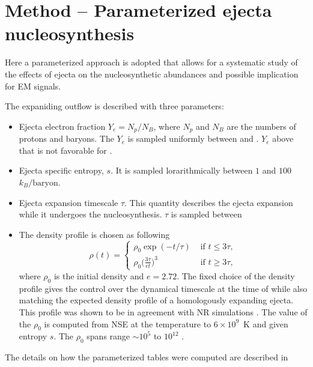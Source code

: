 \section{Method -- Parameterized ejecta nucleosynthesis}


Here a parameterized approach is adopted that allows for a systematic study of the effects of ejecta on the nucleosynthetic abundances and possible implication for \ac{EM} signals. 

The expaniding outflow is described with three parameters:

\begin{itemize}
    \item Ejecta electron fraction $Y_e=N_p/N_B$, where $N_p$ and $N_B$ are the numbers of protons and baryons. The $Y_e$ is sampled uniformly between  and . $Y_e$ above that is not favorable for \rproc{}.
    \item Ejecta specific entropy, $s$. It is sampled lorarithmically between $1$ and $100$ $k_B/\text{baryon}$.
    \item Ejecta expansion timescale $\tau$. This quantity describes the ejecta expansion while it undergoes the nucleosynthesis. $\tau$ is sampled between  
    \item The density profile is chosen as following 
    \begin{equation}
        \rho(t) = 
        \begin{cases}
            \rho_0 \exp(-t / \tau) & \text{ if } t \leq 3\tau, \\
            \rho_0 \Big(\frac{3\tau}{e t})^3 & \text{ if } t \geq 3\tau, 
        \end{cases}
    \end{equation}
    where $\rho_0$ is the initial density and $e = 2.72$.
    The fixed choice of the density profile gives the control over the dynamical timescale at the time of \rproc{} 
    while also matching the expected density profile of a homologously expanding ejecta.
    This profile was shown to be in agreement with \ac{NR} simulations \citep{Lippuner:2015gwa,Foucart:2014nda}.
    The value of the $\rho_0$ is computed from \ac{NSE} at the temperature to $6\times10^9$~K and given 
    entropy $s$. The $\rho_0$ spans range $\sim10^5$ to $10^{12}$ \gcm.
\end{itemize}


The details on how the parameterized \nuc{} tables were computed are described in \cite{Lippuner:2015gwa}

